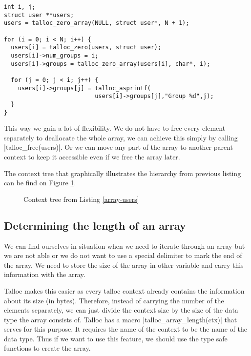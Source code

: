 \begin{lstlisting}[caption={Array of users and context hierarchy},
label={array-users}] int i, j;
struct user **users;
users = talloc_zero_array(NULL, struct user*, N + 1);

for (i = 0; i < N; i++) {
  users[i] = talloc_zero(users, struct user);
  users[i]->num_groups = i;
  users[i]->groups = talloc_zero_array(users[i], char*, i);
  
  for (j = 0; j < i; j++) {
    users[i]->groups[j] = talloc_asprintf(
                          users[i]->groups[j],"Group %d",j);
  }
}
\end{lstlisting}

This way we gain a lot of flexibility. We do not have to free every element
separately to deallocate the whole array, we can achieve this simply by calling
|talloc_free(users)|. Or we can move any part of the array to another parent
context to keep it accessible even if we free the array later.

The context tree that graphically illustrates the hierarchy from previous
listing can be find on Figure \ref{fig:context-tree-array}.

\begin{figure}[H]
  \centering
  
  \caption{Context tree from Listing \ref{array-users}}
  \label{fig:context-tree-array}
\end{figure}

\subsection{Determining the length of an array}

We can find ourselves in situation when we need to iterate through an array but
we are not able or we do not want to use a special delimiter to mark the end of
the array. We need to store the size of the array in other variable and carry
this information with the array.

Talloc makes this easier as every talloc context already contains the
information about its size (in bytes). Therefore, instead of carrying the number
of the elements separately, we can just divide the context size by the size of
the data type the array consists of. Talloc has a macro
|talloc_array_length(ctx)| that serves for this purpose. It requires the name of
the context to be the name of the data type. Thus if we want to use this
feature, we should use the type safe functions to create the array.

